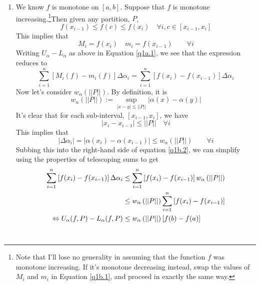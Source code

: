 \documentclass[12pt]{article}
\theoremstyle{plain}
\theoremstyle{definition}
\theoremstyle{remark}
\begin{document}
\begin{enumerate}
\begin{enumerate}
    \item We know $f$ is monotone on $[a,b]$. Suppose that 
        $f$ is monotone increasing.\footnote{
        Note that I'll lose no generality in assuming
        that the function $f$ was monotone increasing.  If it's
        monotone decreasing instead, swap the values of $M_i$
        and $m_i$ in Equation \ref{q1b.1}, and proceed in 
        exactly the same way.}Then given any partition,
        $P$,
        \[ f(x_{i-1}) \leq f(c) \leq f(x_i) \quad \forall i, 
            c \in [x_{i-1}, x_i]\]
        This implies that 
        \begin{equation}
            M_i = f(x_i) \quad m_i=f(x_{i-1})\qquad\forall i
            \label{q1b.1}
        \end{equation}
        Writing $U_\alpha - L_\alpha$ as above in Equation 
        \ref{q1a.1}, we see that the expression reduces to
        \begin{equation}
            \label{q1b.2}
            \sum^n_{i=1} \left[M_i(f) - m_i(f)\right]
            \Delta\alpha_i = 
            \sum^n_{i=1} \left[f(x_{i}) - f(x_{i-1})\right]
            \Delta\alpha_i 
        \end{equation}
        Now let's consider $w_\alpha\left(||P||\right)$.
        By definition, it is
            \[ w_\alpha\left(||P||\right) := 
                \sup_{|x-y|\leq ||P||} |\alpha(x)-\alpha(y)|
                \]
        It's clear that for each sub-interval, $[x_{i-1}, x_i]$,
        we have
            \[ |x_{i}-x_{i-1}| \leq ||P|| \quad \forall i\]
        This implies that
            \[ |\Delta \alpha_i| = 
                |\alpha(x_i) - \alpha(x_{i-1})| \leq
                w_\alpha\left(||P||\right) \qquad \forall i\]
        Subbing this into the right-hand side of equation 
        \ref{q1b.2}, we can simplify using the properties 
        of telescoping sums to get
        \begin{align}
            \sum^n_{i=1} \left[f(x_{i}) - f(x_{i-1})\right]
            \Delta\alpha_i  &\leq 
            \sum^n_{i=1} \left[f(x_{i}) - f(x_{i-1})\right]
             w_\alpha\left(||P||\right) \notag\\
            &\leq w_\alpha\left(||P||\right) 
            \sum^n_{i=1} \left[f(x_{i}) - f(x_{i-1})\right]
             \notag \\
            \Leftrightarrow U_\alpha(f,P) - L_\alpha(f,P) 
            &\leq w_\alpha\left(||P||\right) [f(b) -f(a)]
            \label{q1b.3}
        \end{align}
        \\

\end{enumerate}
\end{enumerate}
\end{document}
